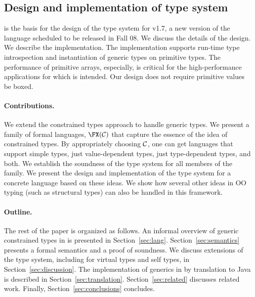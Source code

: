 \subsection{Design and implementation of \Xten{} type system}
\FXGD{} is the basis for the design of the type system for \Xten{} v1.7, a new
version of the language scheduled to be released in Fall 08.  We
discuss the details of the design. We describe the implementation.
The implementation supports run-time type introspection and
instantiation of generic types on primitive types.  The performance of
primitive arrays, especially, is critical for the high-performance
applications for which \Xten{} is intended.
Our design does not require primitive values be boxed.

\paragraph{Contributions.}
We extend the constrained types approach to handle generic types.  We
present a family of formal languages, $\FX(\cal C)$ that capture the
essence of the idea of constrained types. By appropriately choosing
$\cal C$, one can get languages that support simple types, just
value-dependent types, just type-dependent types, and both. We
establish the soundness of the type system for all members of the
family. We present the design and implementation of the type system
for a concrete language \Xten{} based on these ideas. We show how
several other ideas in OO typing (such as structural types) can also
be handled in this framework.

\paragraph{Outline.}

The rest of the paper is organized as follows.
%
An informal overview of generic constrained types in \Xten{}
is presented in
Section~\ref{sec:lang}.  
%
Section~\ref{sec:semantics} presents a formal semantics and a
proof of soundness.
%
We discuss extensions of the type system, including for
virtual types and self types, in
Section~\ref{sec:discussion}.
%
The implementation of generics in \Xten{} by translation to Java is described in 
Section~\ref{sec:translation}.
%
Section~\ref{sec:related} discusses related work.
%
Finally, Section~\ref{sec:conclusions} concludes.


